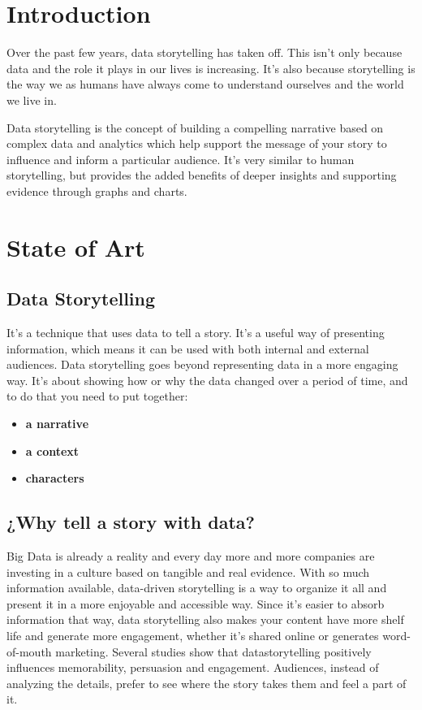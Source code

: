 \documentclass{article}
\begin{document}
\newpage 


\begin{multicols}{2}

\section{Introduction}
Over the past few years, data storytelling has taken off. This isn't only because data and the role it plays in our lives is increasing. It’s also because storytelling is the way we as humans have always come to understand ourselves and the world we live in.

Data storytelling is the concept of building a compelling narrative based on complex data and analytics which help support the message of your story to influence and inform a particular audience. It's very similar to human storytelling, but provides the added benefits of deeper insights and supporting evidence through graphs and charts.
 
\section{State of Art}

\subsection{Data Storytelling}
It's a technique that uses data to tell a story. It's a useful way of presenting information, which means it can be used with both internal and external audiences.
Data storytelling goes beyond representing data in a more engaging way. It's about showing how or why the data changed over a period of time, and to do that you need to put together:

\begin{itemize}
\item \textbf{ a narrative}
\item \textbf{ a context}
\item \textbf{characters}
\end{itemize}

\subsection{¿Why tell a story with data?}
 Big Data is already a reality and every day more and more companies are investing in a culture based on tangible and real evidence.
 With so much information available, data-driven storytelling is a way to organize it all and present it in a more enjoyable and accessible way.
Since it's easier to absorb information that way, data storytelling also makes your content have more shelf life and generate more engagement, whether it's shared online or generates word-of-mouth marketing.
Several studies show that datastorytelling positively influences memorability, persuasion and engagement. Audiences, instead of analyzing the details, prefer to see where the story takes them and feel a part of it.
 

\end{multicols}
\end{document}
